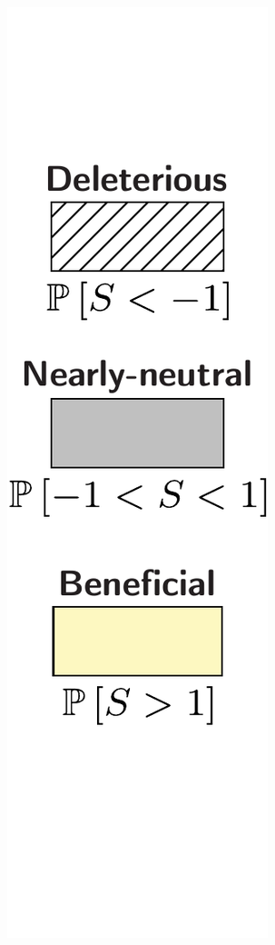 \begin{minipage}{0.09\linewidth}
    \includegraphics[width=\linewidth, page=1]{artworks/legend.polycat.top}
\end{minipage}
\\

